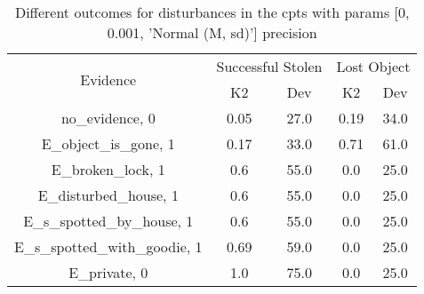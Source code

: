 \begin{table}\begin{tabular}{c|cc|cc}\toprule\multirow{2}{*}{Evidence} & \multicolumn{2}{c}{Successful Stolen} & \multicolumn{2}{c}{Lost Object} \\& {K2} & {Dev} & {K2} & {Dev} \\\midrule
no\_evidence, 0 & \cellcolor{Bittersweet}0.05&\cellcolor{Bittersweet}27.0&\cellcolor{Bittersweet}0.19&\cellcolor{Bittersweet}34.0\\E\_object\_is\_gone, 1 & \cellcolor{Bittersweet}0.17&\cellcolor{Bittersweet}33.0&\cellcolor{Bittersweet}0.71&\cellcolor{Bittersweet}61.0\\E\_broken\_lock, 1 & \cellcolor{Bittersweet}0.6&\cellcolor{Bittersweet}55.0&\cellcolor{Bittersweet}0.0&\cellcolor{Bittersweet}25.0\\E\_disturbed\_house, 1 & \cellcolor{Bittersweet}0.6&\cellcolor{Bittersweet}55.0&\cellcolor{Bittersweet}0.0&\cellcolor{Bittersweet}25.0\\E\_s\_spotted\_by\_house, 1 & \cellcolor{Bittersweet}0.6&\cellcolor{Bittersweet}55.0&\cellcolor{Bittersweet}0.0&\cellcolor{Bittersweet}25.0\\E\_s\_spotted\_with\_goodie, 1 & \cellcolor{Bittersweet}0.69&\cellcolor{Bittersweet}59.0&\cellcolor{Bittersweet}0.0&\cellcolor{Bittersweet}25.0\\E\_private, 0 & \cellcolor{Bittersweet}1.0&\cellcolor{Bittersweet}75.0&\cellcolor{Bittersweet}0.0&\cellcolor{Bittersweet}25.0\\\bottomrule\end{tabular}\caption{Different outcomes for disturbances in the cpts with params [0, 0.001, 'Normal (M, sd)'] precision}\end{table}